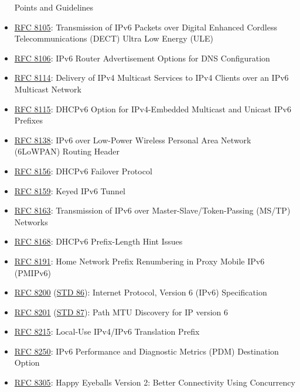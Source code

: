 \documentclass[
]{article}
\begin{document}
\begin{itemize}
  Points and Guidelines
\item
  \href{https://www.rfc-editor.org/info/rfc8105}{RFC 8105}: Transmission
  of IPv6 Packets over Digital Enhanced Cordless Telecommunications
  (DECT) Ultra Low Energy (ULE)
\item
  \href{https://www.rfc-editor.org/info/rfc8106}{RFC 8106}: IPv6 Router
  Advertisement Options for DNS Configuration
\item
  \href{https://www.rfc-editor.org/info/rfc8114}{RFC 8114}: Delivery of
  IPv4 Multicast Services to IPv4 Clients over an IPv6 Multicast Network
\item
  \href{https://www.rfc-editor.org/info/rfc8115}{RFC 8115}: DHCPv6
  Option for IPv4-Embedded Multicast and Unicast IPv6 Prefixes
\item
  \href{https://www.rfc-editor.org/info/rfc8138}{RFC 8138}: IPv6 over
  Low-Power Wireless Personal Area Network (6LoWPAN) Routing Header
\item
  \href{https://www.rfc-editor.org/info/rfc8156}{RFC 8156}: DHCPv6
  Failover Protocol
\item
  \href{https://www.rfc-editor.org/info/rfc8159}{RFC 8159}: Keyed IPv6
  Tunnel
\item
  \href{https://www.rfc-editor.org/info/rfc8163}{RFC 8163}: Transmission
  of IPv6 over Master-Slave/Token-Passing (MS/TP) Networks
\item
  \href{https://www.rfc-editor.org/info/rfc8168}{RFC 8168}: DHCPv6
  Prefix-Length Hint Issues
\item
  \href{https://www.rfc-editor.org/info/rfc8191}{RFC 8191}: Home Network
  Prefix Renumbering in Proxy Mobile IPv6 (PMIPv6)
\item
  \href{https://www.rfc-editor.org/info/rfc8200}{RFC 8200}
  (\href{https://www.rfc-editor.org/info/std86}{STD 86}): Internet
  Protocol, Version 6 (IPv6) Specification
\item
  \href{https://www.rfc-editor.org/info/rfc8201}{RFC 8201}
  (\href{https://www.rfc-editor.org/info/std87}{STD 87}): Path MTU
  Discovery for IP version 6
\item
  \href{https://www.rfc-editor.org/info/rfc8215}{RFC 8215}: Local-Use
  IPv4/IPv6 Translation Prefix
\item
  \href{https://www.rfc-editor.org/info/rfc8250}{RFC 8250}: IPv6
  Performance and Diagnostic Metrics (PDM) Destination Option
\item
  \href{https://www.rfc-editor.org/info/rfc8305}{RFC 8305}: Happy
  Eyeballs Version 2: Better Connectivity Using Concurrency

\end{itemize}
\end{document}
